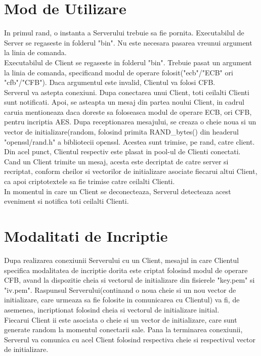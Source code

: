 \documentclass{article}
\begin{document}
\section{Mod de Utilizare}
In primul rand, o instanta a Serverului trebuie sa fie pornita. Executabilul de Server se regaseste in folderul "bin". Nu este necesara pasarea vreunui argument la linia de comanda. \\
Executabilul de Client se regaseste in folderul "bin". Trebuie pasat un argument la linia de comanda, specificand modul de operare folosit("ecb"/"ECB" ori "cfb"/"CFB"). Daca argumentul este invalid, Clientul va folosi CFB. \\
Serverul va astepta conexiuni. Dupa conectarea unui Client, toti ceilalti Clienti sunt notificati. Apoi, se asteapta un mesaj din partea noului Client, in cadrul caruia mentioneaza daca doreste sa foloseasca modul de operare ECB, ori CFB, pentru incriptia AES. Dupa receptionarea mesajului, se creaza o cheie noua si un vector de initializare(random, folosind primita RAND\_bytes() din headerul "openssl/rand.h" a bibliotecii openssl. Acestea sunt trimise, pe rand, catre client. Din acel punct, Clientul respectiv este plasat in pool-ul de Clienti conectati. \\
Cand un Client trimite un mesaj, acesta este decriptat de catre server si recriptat, conform cheilor si vectorilor de initializare asociate fiecarui altui Client, ca apoi criptotextele sa fie trimise catre ceilalti Clienti. \\
In momentul in care un Client se deconecteaza, Serverul detecteaza acest eveniment si notifica toti ceilalti Clienti.


\section{Modalitati de Incriptie}
Dupa realizarea conexiunii Serverului cu un Client, mesajul in care Clientul specifica modalitatea de incriptie dorita este criptat folosind modul de operare CFB, avand la dispozitie cheia si vectorul de initializare din fisierele "key.pem" si "iv.pem". Raspunsul Serverului(continand o noua cheie si un nou vector de initializare, care urmeaza sa fie folosite in comunicarea cu Clientul) va fi, de asemenea, incriptionat folosind cheia si vectorul de initializare initial. \\
Fiecarui Client ii este asociata o cheie si un vector de initializare, care sunt generate random la momentul conectarii sale. Pana la terminarea conexiunii, Serverul va comunica cu acel Client folosind respectiva cheie si respectivul vector de initializare.
\end{document}
